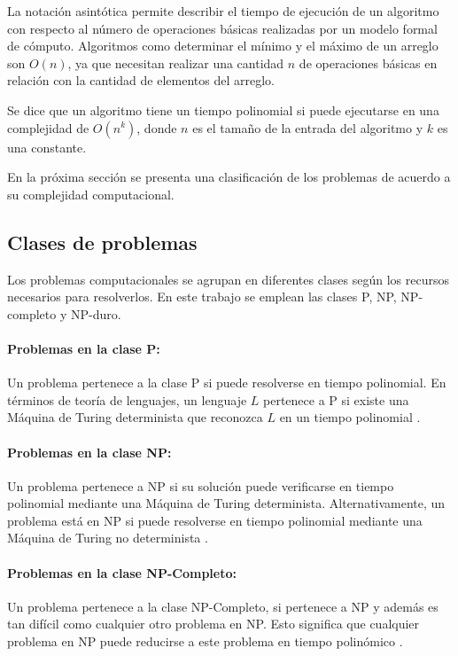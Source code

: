 \documentclass[12pt]{article}
\begin{document}
La notación asintótica permite describir el tiempo de ejecución de un algoritmo con respecto al número de 
operaciones básicas realizadas por un modelo formal de cómputo.  Algoritmos como determinar el mínimo y el 
máximo de un arreglo son $O(n)$, ya que necesitan realizar una cantidad $n$ de operaciones básicas en relación 
con la cantidad de elementos del arreglo.

Se dice que un algoritmo tiene un tiempo polinomial si puede ejecutarse en una complejidad de $O(n^k)$, donde $n$ es el tamaño de la entrada del algoritmo y $k$
es una constante. 

En la próxima sección se presenta una clasificación de los problemas de acuerdo a su complejidad computacional.
\subsection{Clases de problemas}

Los problemas computacionales \cite{authomataTheory} se agrupan en diferentes clases según los recursos 
necesarios para resolverlos. En este trabajo se emplean las clases P, NP, NP-completo y NP-duro.

\paragraph{Problemas en la clase P:} Un problema pertenece a la clase P si puede resolverse en tiempo polinomial. En términos de teoría de lenguajes, un lenguaje
$L$ pertenece a P si existe una Máquina de Turing determinista que reconozca $L$ en un tiempo polinomial \cite{authomataTheory}.

\paragraph{Problemas en la clase NP:}
Un problema pertenece a NP si su solución puede verificarse en tiempo polinomial mediante una Máquina de Turing determinista. Alternativamente, un problema está en NP si puede resolverse en tiempo polinomial mediante una Máquina de Turing no determinista \cite{authomataTheory}.

\paragraph{Problemas en la clase NP-Completo:}
Un problema pertenece a la clase NP-Completo, si pertenece a NP y además es tan difícil como cualquier otro problema en NP. Esto significa que cualquier problema en NP puede reducirse a este problema en tiempo polinómico \cite{authomataTheory}.
\end{document}
